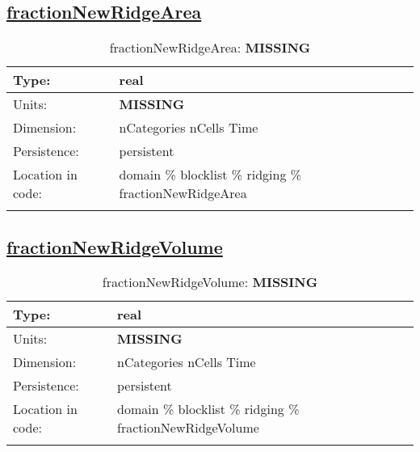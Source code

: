 \subsection[fractionNewRidgeArea]{\hyperref[sec:var_tab_ridging]{fractionNewRidgeArea}}
\label{subsec:var_sec_ridging_fractionNewRidgeArea}
\begin{center}
\begin{longtable}{| p{2.0in} | p{4.0in} |}
        \hline 
        Type: & real \\
        \hline 
        Units: & {\bf \color{red} MISSING} \\
        \hline 
        Dimension: & nCategories nCells Time \\
        \hline 
        Persistence: & persistent \\
        \hline 
         Location in code: & domain \% blocklist \% ridging \% fractionNewRidgeArea \\
         \hline 
    \caption{fractionNewRidgeArea: {\bf \color{red} MISSING}}
\end{longtable}
\end{center}
\subsection[fractionNewRidgeVolume]{\hyperref[sec:var_tab_ridging]{fractionNewRidgeVolume}}
\label{subsec:var_sec_ridging_fractionNewRidgeVolume}
\begin{center}
\begin{longtable}{| p{2.0in} | p{4.0in} |}
        \hline 
        Type: & real \\
        \hline 
        Units: & {\bf \color{red} MISSING} \\
        \hline 
        Dimension: & nCategories nCells Time \\
        \hline 
        Persistence: & persistent \\
        \hline 
         Location in code: & domain \% blocklist \% ridging \% fractionNewRidgeVolume \\
         \hline 
    \caption{fractionNewRidgeVolume: {\bf \color{red} MISSING}}
\end{longtable}
\end{center}
